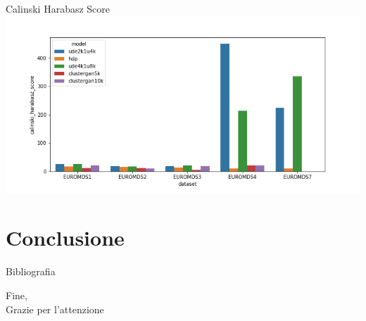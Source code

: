 \documentclass{beamer}
\begin{document}
\begin{frame}{Calinski Harabasz Score}
	\centering
	\includegraphics[width=\textwidth, keepaspectratio]{./images/cal_har_score.png}
\end{frame}


\section{Conclusione}

\begin{frame}{Bibliografia}
	\fontsize{8pt}{7.2}\selectfont
	
	
\end{frame}

\begin{frame}{}
	Fine,\\
	Grazie per l'attenzione
\end{frame}
\end{document}
